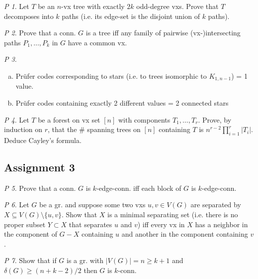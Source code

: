 \documentclass[11pt, fleqn, a4paper, landscape]{article}
\theoremstyle{plain} %
\theoremstyle{remark} %
\newtheorem{problem}{P}
\theoremstyle{definition} %
\begin{document}
\begin{multicols}{5}
\begin{problem}
Let $T$ be an $n$-vx tree with exactly $2k$ odd-degree vxs. Prove that $T$ decomposes into $k$ paths (i.e. its edge-set is the disjoint union of $k$ paths).
\end{problem}

\begin{problem}
Prove that a conn. $G$ is a tree iff any family of pairwise (vx-)intersecting paths $P_1,\dots,P_k$ in $G$ have a common vx.
\end{problem}

\begin{problem}
\begin{enumerate}[(a)]
\item Prüfer codes corresponding to stars (i.e. to trees isomorphic to $K_{1,n-1}$) = 1 value.
\item Prüfer codes containing exactly 2 different values = 2 connected stars
\end{enumerate}
\end{problem}

\begin{problem}
Let $T$ be a forest on vx set $[n]$ with components $T_1,\dots,T_r$. Prove, by induction on $r$, that the \# spanning trees on $[n]$ containing $T$ is $n^{r-2}\prod_{i=1}^{r}|T_i|$. Deduce Cayley's formula.
\end{problem}

\subsection{Assignment 3}

\begin{problem}
Prove that a conn. $G$ is $k$-edge-conn. iff each block of $G$ is $k$-edge-conn.
\end{problem}

\begin{problem}
Let $G$ be a gr. and suppose some two vxs $u, v \in V (G)$ are separated by $X \subseteq V (G)\setminus\{u,v\}$. Show that $X$ is a minimal separating set (i.e. there is no proper subset $Y\subset X$ that separates $u$ and $v$) iff every vx in $X$ has a neighbor in the component
of $G-X$ containing $u$ and another in the component containing $v$.
\end{problem}

\begin{problem}
Show that if $G$ is a gr. with $|V (G)| = n \ge k + 1$ and $\delta(G) \ge(n + k-2)/2$ then $G$ is $k$-conn.
\end{problem}


\end{multicols}
\end{document}
